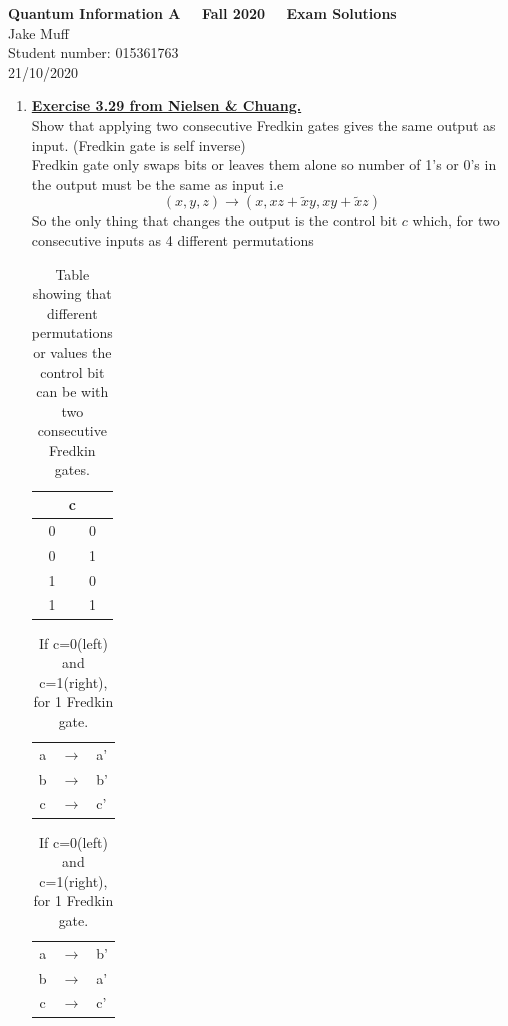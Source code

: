 \documentclass[12pt]{article}
\begin{document}
\normalsize

\baselineskip 14pt

\begin{center}
{\Large {\bf Quantum Information A \ \ Fall 2020 \ \  Exam Solutions}}\\
{\large { Jake Muff}}\\
{Student number: 015361763}\\
{21/10/2020}
\end{center}



\begin{enumerate}

\item \textbf{\underline{Exercise 3.29 from Nielsen \& Chuang.}}
\\
Show that applying two consecutive Fredkin gates gives the same output as input. (Fredkin gate is self inverse)
\\
Fredkin gate only swaps bits or leaves them alone so number of 1's or 0's in the output must be the same as input i.e 
$$ (x,y,z) \rightarrow (x,xz+\tilde{x}y, xy + \tilde{x}z)$$
So the only thing that changes the output is the control bit $c$ which, for two consecutive inputs as 4 different permutations
\begin{table}[h]
    \centering
    \begin{tabular}{|c|c|}
    \hline
    \multicolumn{2}{|c|}{c} \\ \hline
    0          & 0          \\ \hline
    0          & 1          \\ \hline
    1          & 0          \\ \hline
    1          & 1          \\ \hline
    \end{tabular}
    \caption{Table showing that different permutations or values the control bit can be with two consecutive Fredkin gates. }
    \label{tab1}
    \end{table}
    \begin{table}[h!]
        \centering
        \begin{tabular}{ccl}
        a & $\rightarrow$ & a' \\
        b & $\rightarrow$ & b' \\
        c & $\rightarrow$ & c'
        \end{tabular}
        \begin{tabular}{ccl}
            a & $\rightarrow$ & b' \\
            b & $\rightarrow$ & a' \\
            c & $\rightarrow$ & c'
            \end{tabular}
        \caption{If c=0(left) and c=1(right), for 1 Fredkin gate.}
        \label{tab1}
        \end{table}
    

\end{enumerate}
\end{document}
